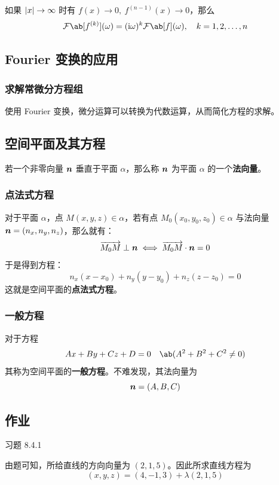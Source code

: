 如果 $\abs{x} \to \infty$ 时有 $f(x) \to 0,\ f^{(n - 1)}(x) \to 0$，那么
$$
\mathcal{F}\ab[f^{(k)}](\omega) = (\I \omega)^k \mathcal{F}\ab[f](\omega), \quad k = 1, 2, \dots, n
$$

\subsection{Fourier 变换的应用}

\subsubsection{求解常微分方程组}

使用 Fourier 变换，微分运算可以转换为代数运算，从而简化方程的求解。

\subsection{空间平面及其方程}

\begin{definition}[法向量]
    若一个非零向量 $\boldsymbol{n}$ 垂直于平面 $\alpha$，那么称 $\boldsymbol{n}$ 为平面 $\alpha$ 的一个\textbf{法向量}。
\end{definition}

\subsubsection{点法式方程}

对于平面 $\alpha$，点 $M(x, y, z) \in \alpha$，若有点 $M_0(x_0, y_0, z_0) \in \alpha$ 与法向量 $\boldsymbol{n} = (n_x, n_y, n_z)$，那么就有：
$$
\overrightarrow{M_0 M} \perp \boldsymbol{n} \iff \overrightarrow{M_0 M} \cdot \boldsymbol{n} = 0
$$
于是得到方程：
$$
n_x (x - x_0) + n_y (y - y_0) + n_z (z - z_0) = 0
$$
这就是空间平面的\textbf{点法式方程}。

\subsubsection{一般方程}

对于方程
$$
A x + B y + C z + D = 0 \quad \ab(A^2 + B^2 + C^2 \ne 0)
$$
其称为空间平面的\textbf{一般方程}。不难发现，其法向量为
$$
\boldsymbol{n} = (A, B, C)
$$

\subsection{作业}

\begin{problem}
    习题 8.4.1
    \begin{solution}
        由题可知，所给直线的方向向量为 $(2, 1, 5)$。因此所求直线方程为
        $$
        (x, y, z) = (4, -1, 3) + \lambda (2, 1, 5)
        $$
    \end{solution}
\end{problem}

